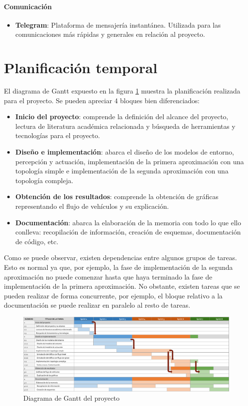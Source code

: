 \paragraph{Comunicación}
\begin{itemize}
    \item \textbf{Telegram}: Plataforma de mensajería instantánea. Utilizada para las comunicaciones más rápidas y generales en relación al proyecto.
\end{itemize}

\section{Planificación temporal}
El diagrama de Gantt expuesto en la figura \ref{fig:gantt} muestra la planificación realizada para el proyecto. Se pueden apreciar 4 bloques bien diferenciados:
\begin{itemize}
    \item \textbf{Inicio del proyecto}: comprende la definición del alcance del proyecto, lectura de literatura académica relacionada y búsqueda de herramientas y tecnologías para el proyecto.
    \item \textbf{Diseño e implementación}: abarca el diseño de los modelos de entorno, percepción y actuación, implementación de la primera aproximación con una topología simple e implementación de la segunda aproximación con una topología compleja.
    \item \textbf{Obtención de los resultados}: comprende la obtención de gráficas representando el flujo de vehículos y su explicación.
    \item \textbf{Documentación}: abarca la elaboración de la memoria con todo lo que ello conlleva: recopilación de información, creación de esquemas, documentación de código, etc.
\end{itemize}
Como se puede observar, existen dependencias entre algunos grupos de tareas. Esto es normal ya que, por ejemplo, la fase de implementación de la segunda aproximación no puede comenzar hasta que haya terminado la fase de implementación de la primera aproximación. No obstante, existen tareas que se pueden realizar de forma concurrente, por ejemplo, el bloque relativo a la documentación se puede realizar en paralelo al resto de tareas.
\begin{figure}[H]
    \centering
    \includegraphics[width=1\linewidth]{text/image/DGantt.pdf}
    \caption{Diagrama de Gantt del proyecto}
    \label{fig:gantt}
\end{figure}

